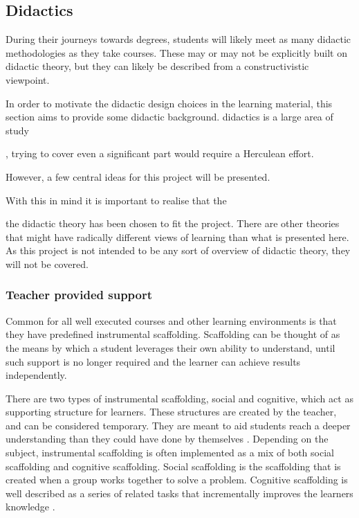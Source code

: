 \subsection{Didactics}\label{sec:didactics}

During their journeys towards degrees, students will likely meet as many \gls{didactic} methodologies as they take courses. These may or may not be explicitly built on \gls{didactic} theory, but they can likely be described from a constructivistic viewpoint.

In order to motivate the \gls{didactic} design choices in the learning material, this section aims to provide some \gls{didactic} background. \Glspl{didactic} is a large area of study%
\begin{newtext}
, trying to cover even a significant part would require a Herculean effort.
\end{newtext}
\begin{modtext}
However, a few central ideas for this project will be presented. 
\end{modtext}
With this in mind it is important to realise that the 
\begin{modtext}
the didactic theory has been chosen to fit the project. There are other theories that might
have radically different views of learning than what is presented here. As this project is not intended to be any sort of overview of didactic theory, they will not be covered.
\end{modtext}

\subsubsection{Teacher provided support}\label{sec:scaff}
Common for all well executed courses and other learning environments is that they have predefined instrumental scaffolding. Scaffolding can be thought of as the means by which a student leverages their own ability to understand, until such support is no longer required and the learner can achieve results independently. 

There are two types of instrumental scaffolding, social and cognitive, which act as supporting structure for learners. These structures are created by the teacher, and can be considered temporary. They are meant to aid students reach a deeper understanding than they could have done by themselves \cite{linder_2006}. Depending on the subject, instrumental scaffolding is often implemented as a mix of both social scaffolding and cognitive scaffolding. Social scaffolding is the scaffolding that is created when a group works together to solve a problem. Cognitive scaffolding is well described as a series of related tasks that incrementally improves the learners knowledge \cite{linder_2006}.

